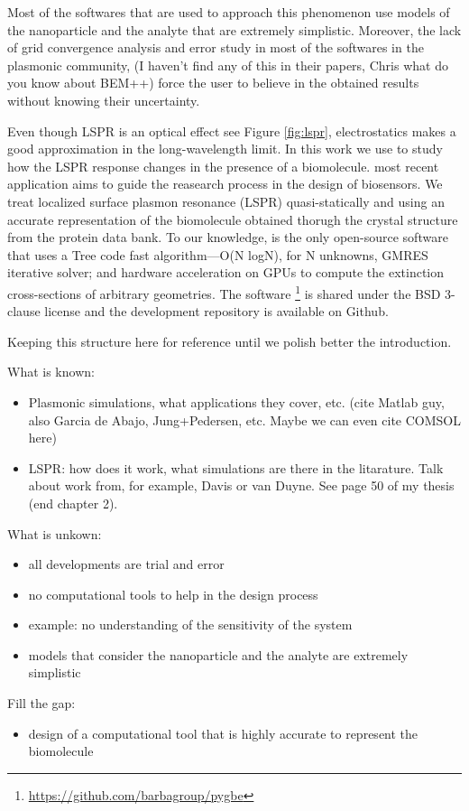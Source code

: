 Most of the softwares that are used to approach this phenomenon use models of 
the nanoparticle and the analyte that are extremely simplistic. Moreover, the 
lack of grid convergence analysis and error study in most of the softwares in 
the plasmonic community, {\color{red}(I haven't find any of this in 
their papers, Chris what do you know about BEM++)} force the user to believe 
in the obtained results without knowing their uncertainty.


Even though LSPR is an optical effect see Figure \ref{fig:lspr}, electrostatics 
makes a good approximation in the long-wavelength limit. In this work we use
\pygbe to study how the LSPR response changes in the presence
of a biomolecule. \pygbe most recent application \cite{ClementiETal2017} aims 
to guide the reasearch process in the design of biosensors. We treat localized 
surface plasmon resonance (LSPR) quasi-statically \cite{MayergoyzZhang2007} and
using an accurate representation of the biomolecule obtained thorugh the 
crystal structure from the protein data bank. To our knowledge, \pygbe is the 
only open-source software that uses a Tree code fast algorithm—O(N logN), for 
N unknowns, GMRES iterative solver; and hardware acceleration on GPUs to compute
the extinction cross-sections of arbitrary geometries. The software
\footnote{\url{https://github.com/barbagroup/pygbe}} is shared under the 
BSD 3-clause license and the development repository is available on Github.

{\color{red}  Keeping this structure here for reference until we polish better
the introduction.

What is known:
\begin{itemize}
\item Plasmonic simulations, what applications they cover, etc. (cite Matlab guy, also Garcia de Abajo, Jung+Pedersen, etc. Maybe we can even cite COMSOL here)
\item LSPR: how does it work, what simulations are there in the litarature. Talk about work from, for example, Davis or van Duyne. See page 50 of my thesis (end chapter 2).
\end{itemize}

What is unkown:
\begin{itemize}
\item all developments are trial and error
\item no computational tools to help in the design process
\item example: no understanding of the sensitivity of the system
\item models that consider the nanoparticle and the analyte are extremely simplistic
\end{itemize}

Fill the gap:
\begin{itemize}
\item design of a computational tool that is highly accurate to represent the biomolecule
\end{itemize}
}

